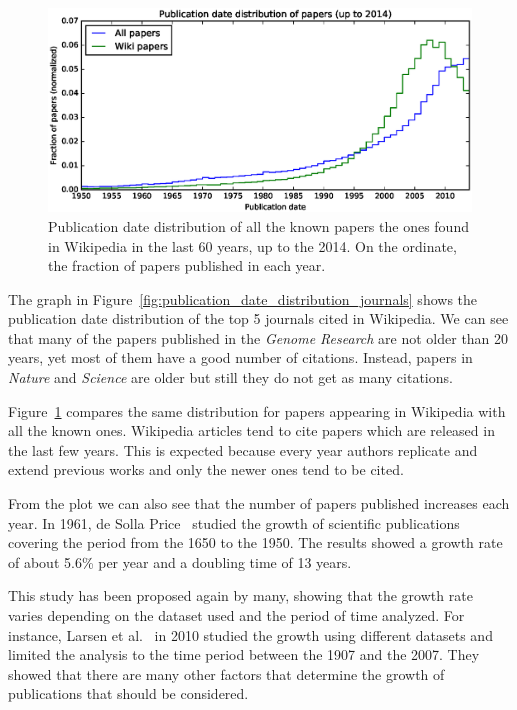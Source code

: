 \begin{figure}[h]
\centering
\includegraphics[keepaspectratio=true, width=\textwidth]{assets/publication_date_pdf}
\caption{Publication date distribution of all the known papers the ones found in Wikipedia in the last 60 years, up to the 2014.
On the ordinate, the fraction of papers published in each year.
}
\label{fig:publication_date_pdf}
\end{figure}

The graph in Figure~\ref{fig:publication_date_distribution_journals} shows the publication date distribution of the top 5 journals cited in Wikipedia.
We can see that many of the papers published in the \emph{Genome Research} are not older than 20 years, yet most of them have a good number of citations.
Instead, papers in \emph{Nature} and \emph{Science} are older but still they do not get as many citations.

Figure~\ref{fig:publication_date_pdf} compares the same distribution for papers appearing in Wikipedia with all the known ones.
Wikipedia articles tend to cite papers which are released in the last few years.
This is expected because every year authors replicate and extend previous works and only the newer ones tend to be cited.

From the plot we can also see that the number of papers published increases each year.
In 1961, de Solla Price~\cite{DeSollaPrice1961} studied the growth of scientific publications covering the period from the 1650 to the 1950.
The results showed a growth rate of about 5.6\% per year and a doubling time of 13 years.

This study has been proposed again by many, showing that the growth rate varies depending on the dataset used and the period of time analyzed.
For instance, Larsen et al.~\cite{Larsen2010} in 2010 studied the growth using different datasets and limited the analysis to the time period between the 1907 and the 2007.
They showed that there are many other factors that determine the growth of publications that should be considered.

